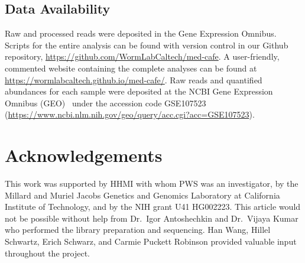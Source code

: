 \documentclass[8pt, twocolumn]{article}
\begin{document}
\subsection*{Data Availability}
Raw and processed reads were deposited in the Gene Expression Omnibus. Scripts
for the entire analysis can be found with version control in our Github
repository, \url{https://github.com/WormLabCaltech/med-cafe}. A user-friendly,
commented website containing the complete analyses can be found at
\url{https://wormlabcaltech.github.io/med-cafe/}. Raw reads and quantified
abundances for each sample were deposited at the NCBI Gene Expression Omnibus
(GEO)~\cite{Edgar2002} under the accession code GSE107523
(\url{https://www.ncbi.nlm.nih.gov/geo/query/acc.cgi?acc=GSE107523}).

\section*{Acknowledgements}
This work was supported by HHMI with whom PWS was an investigator, by the
Millard and Muriel Jacobs Genetics and Genomics Laboratory at California
Institute of Technology, and by the NIH grant U41 HG002223. This article would
not be possible without help from Dr.\ Igor Antoshechkin and Dr.\ Vijaya Kumar
who performed the library preparation and sequencing. Han Wang, Hillel Schwartz,
Erich Schwarz, and Carmie Puckett Robinson provided valuable input throughout
the project.


% 

\end{document}
